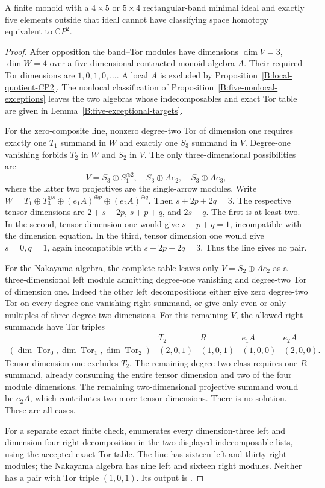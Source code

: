 \begin{lemma}\label{C:four-by-five-five-outside-CP2}
A finite monoid with a $4\times5$ or $5\times4$ rectangular-band
minimal ideal and exactly five elements outside that ideal cannot
have classifying space homotopy equivalent to $\mathbb CP^2$.
\end{lemma}
\begin{proof}
After opposition the band--Tor modules have dimensions
$\dim V=3$, $\dim W=4$ over a five-dimensional contracted monoid
algebra $A$.  Their required Tor dimensions are $1,0,1,0,\ldots$.
A local $A$ is excluded by Proposition~\ref{B:local-quotient-CP2}.
The nonlocal classification of
Proposition~\ref{B:five-nonlocal-exceptions} leaves the two algebras
whose indecomposables and exact Tor table are given in
Lemma~\ref{B:five-exceptional-targets}.

For the zero-composite line, nonzero degree-two Tor of dimension
one requires exactly one $T_1$ summand in $W$ and exactly one
$S_3$ summand in $V$.  Degree-one vanishing forbids $T_2$ in $W$
and $S_2$ in $V$.  The only three-dimensional possibilities are
\[
 V=S_3\oplus S_1^{\oplus2},\quad
 S_3\oplus Ae_2,\quad S_3\oplus Ae_3,
\]
where the latter two projectives are the single-arrow modules.
Write
$W=T_1\oplus T_3^{\oplus s}\oplus(e_1A)^{\oplus p}
                         \oplus(e_2A)^{\oplus q}$.
Then $s+2p+2q=3$.  The respective tensor dimensions are
$2+s+2p$, $s+p+q$, and $2s+q$.
The first is at least two.  In the second, tensor dimension one
would give $s+p+q=1$, incompatible with the dimension equation.
In the third, tensor dimension one would give $s=0,q=1$, again
incompatible with $s+2p+2q=3$.  Thus the line gives no pair.

For the Nakayama algebra, the complete table leaves only
$V=S_2\oplus Ae_2$ as a three-dimensional left module admitting
degree-one vanishing and degree-two Tor of dimension one.
Indeed the other left decompositions either give zero degree-two
Tor on every degree-one-vanishing right summand, or give only
even or only multiples-of-three degree-two dimensions.
For this remaining $V$, the allowed right summands have Tor triples
\[
\begin{array}{c|rrrr}
 &T_2&R&e_1A&e_2A\\\hline
(\dim\operatorname{Tor}_0,\dim\operatorname{Tor}_1,
 \dim\operatorname{Tor}_2)&(2,0,1)&(1,0,1)&(1,0,0)&(2,0,0).
\end{array}
\]
Tensor dimension one excludes $T_2$.  The remaining degree-two
class requires one $R$ summand, already consuming the entire
tensor dimension and two of the four module dimensions.
The remaining two-dimensional projective summand would be
$e_2A$, which contributes two more tensor dimensions.
There is no solution.  These are all cases.

For a separate exact finite check,
 enumerates every
dimension-three left and dimension-four right decomposition in
the two displayed indecomposable lists, using the accepted exact
Tor table.  The line has sixteen left and thirty right modules;
the Nakayama algebra has nine left and sixteen right modules.
Neither has a pair with Tor triple $(1,0,1)$.
Its output is .
\end{proof}
